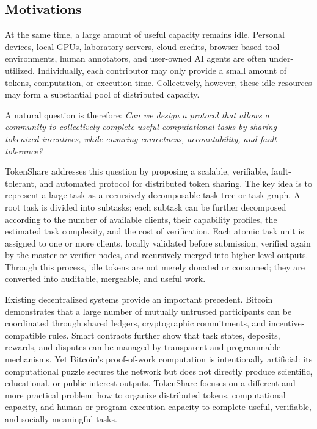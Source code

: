\documentclass{article}
\theoremstyle{plain}
\begin{document}
\subsection{Motivations}

At the same time, a large amount of useful capacity remains idle. Personal devices, local GPUs, laboratory servers, cloud credits, browser-based tool environments, human annotators, and user-owned AI agents are often under-utilized. Individually, each contributor may only provide a small amount of tokens, computation, or execution time. Collectively, however, these idle resources may form a substantial pool of distributed capacity.

A natural question is therefore: \emph{Can we design a protocol that allows a community to collectively complete useful computational tasks by sharing tokenized incentives, while ensuring correctness, accountability, and fault tolerance?}


TokenShare addresses this question by proposing a scalable, verifiable, fault-tolerant, and automated protocol for distributed token sharing. The key idea is to represent a large task as a recursively decomposable task tree or task graph. A root task is divided into subtasks; each subtask can be further decomposed according to the number of available clients, their capability profiles, the estimated task complexity, and the cost of verification. Each atomic task unit is assigned to one or more clients, locally validated before submission, verified again by the master or verifier nodes, and recursively merged into higher-level outputs. Through this process, idle tokens are not merely donated or consumed; they are converted into auditable, mergeable, and useful work.

Existing decentralized systems provide an important precedent. Bitcoin demonstrates that a large number of mutually untrusted participants can be coordinated through shared ledgers, cryptographic commitments, and incentive-compatible rules. Smart contracts further show that task states, deposits, rewards, and disputes can be managed by transparent and programmable mechanisms. Yet Bitcoin's proof-of-work computation is intentionally artificial: its computational puzzle secures the network but does not directly produce scientific, educational, or public-interest outputs. TokenShare focuses on a different and more practical problem: how to organize distributed tokens, computational capacity, and human or program execution capacity to complete useful, verifiable, and socially meaningful tasks.
\end{document}
